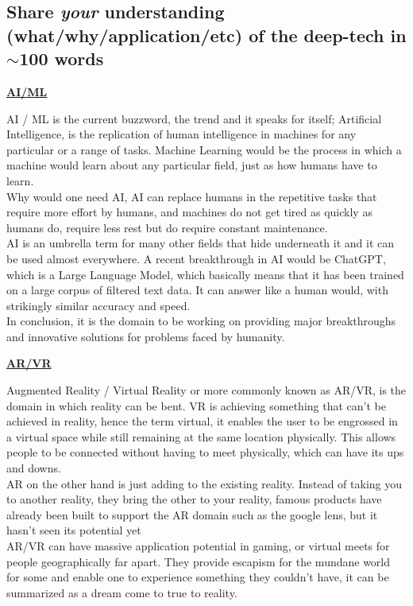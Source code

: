 \documentclass[a4paper]{article}
\begin{document}
\subsection{Share \textit{your} understanding (what/why/application/etc) of the deep-tech in $\sim$100 words}

\large{
\begin{center}
    \textbf{\underline{AI/ML}}
\end{center}

AI / ML is the current buzzword, the trend and it speaks for itself; Artificial Intelligence, is the replication of human intelligence in machines for any particular or a range of tasks. Machine Learning would be the process in which a machine would learn about any particular field, just as how humans have to learn.
\\Why would one need AI, AI can replace humans in the repetitive tasks that require more effort by humans, and machines do not get tired as quickly as humans do, require less rest but do require constant maintenance.
\\AI is an umbrella term for many other fields that hide underneath it and it can be used almost everywhere. A recent breakthrough in AI would be ChatGPT, which is a Large Language Model, which basically means that it has been trained on a large corpus of filtered text data. It can answer like a human would, with strikingly similar accuracy and speed.
\\In conclusion, it is the domain to be working on providing major breakthroughs and innovative solutions for problems faced by humanity.

\begin{center}
    \textbf{\underline{AR/VR}}
\end{center}

Augmented Reality / Virtual Reality or more commonly known as AR/VR, is the domain in which reality can be bent. VR is achieving something that can't be achieved in reality, hence the term virtual, it enables the user to be engrossed in a virtual space while still remaining at the same location physically. This allows people to be connected without having to meet physically, which can have its ups and downs.
\\AR on the other hand is just adding to the existing reality. Instead of taking you to another reality, they bring the other to your reality, famous products have already been built to support the AR domain such as the google lens, but it hasn't seen its potential yet
\\AR/VR can have massive application potential in gaming, or virtual meets for people geographically far apart. They provide escapism for the mundane world for some and enable one to experience something they couldn't have, it can be summarized as a dream come to true to reality.
}
\end{document}
